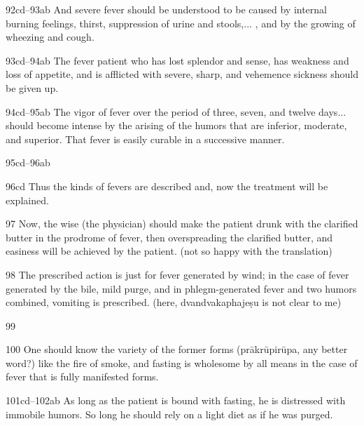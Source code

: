 \begin{translation}
    \item[92cd--93ab]  And severe fever should be understood to be caused by
    internal burning feelings, thirst, suppression of urine and stools,...
    , and by the growing of wheezing and cough.
    
    \item[93cd--94ab]  The fever patient who has lost splendor and sense, has
    weakness and loss of appetite, and is afflicted with severe, sharp, and
    vehemence sickness should be given up.
    
    
    \item[94cd--95ab]  The vigor of fever over the period of three, seven, and
    twelve days... should become intense by the arising of the humors that
    are inferior, moderate, and superior. That fever is easily curable in a successive manner.
    
   \item[95cd--96ab]  
    
    \item[96cd]  Thus the kinds of fevers are described and, now the treatment 
will
    be explained.
    
    \item[97]  Now, the wise (the physician) should make the patient drunk with 
the
    clarified butter in the prodrome of fever, then overspreading the
    clarified butter, and easiness will be achieved by the patient. (not so
    happy with the translation)
    
    \item[98]  The prescribed action is just for fever generated by wind; in the
    case of fever generated by the bile, mild purge, and in phlegm-generated
    fever and two humors combined, vomiting is prescribed.  (here,
    dvandvakaphajeṣu is not clear to me)
    
    
   \item[99]  
    
    \item[100]  One should know the variety of the former forms (prākrūpirūpa, 
any
    better word?) like the fire of smoke, and fasting is wholesome by all
    means in the case of fever that is fully manifested forms.
    
    \item[101cd--102ab]  As long as the patient is bound with fasting, he is
    distressed with immobile humors. So long he should rely on a light diet
    as if he was purged.
    

\end{translation}
